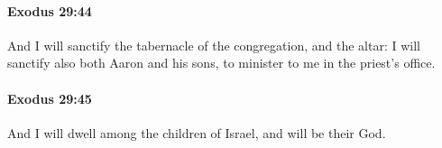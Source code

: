 		\paragraph{Exodus 29:44} %
			\label{EXODUS-29-44}

			And I will sanctify the tabernacle of the congregation, and the altar: I will sanctify also both Aaron and his sons, to minister to me in the priest's office.


		\paragraph{Exodus 29:45} %
			\label{EXODUS-29-45}

			And I will dwell among the children of Israel, and will be their God.


